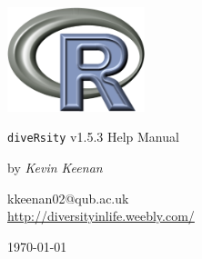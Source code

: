 \begin{titlepage}
\begin{center}
\includegraphics[width=40mm]{Rlogo_3.png}
\end{center}
\begin{center}
\LARGE
\texttt{diveRsity} v1.5.3 Help Manual
\end{center}
\begin{center}
\Large
by \emph{Kevin Keenan}
\end{center}
\begin{center}
\normalsize
kkeenan02@qub.ac.uk\\
\vspace{0.5cm}
\url{http://diversityinlife.weebly.com/}
\end{center}
\begin{center}
\small
\today
\end{center}
\end{titlepage}